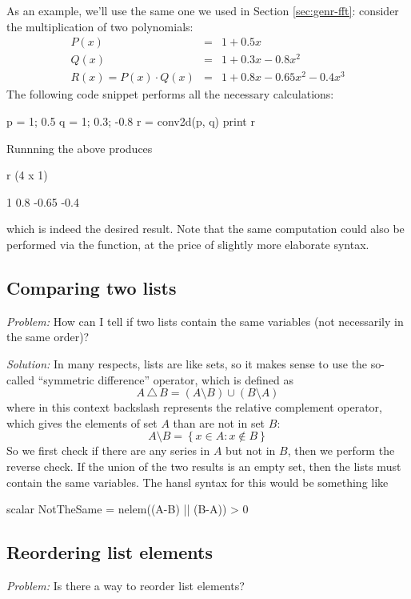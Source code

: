 As an example, we'll use the same one we used in Section
\ref{sec:genr-fft}: consider the multiplication of two polynomials:
\begin{eqnarray*}
  P(x) & = & 1 + 0.5 x \\
  Q(x) & = & 1 + 0.3 x - 0.8 x^2 \\
  R(x) = P(x) \cdot Q(x) & = & 1 + 0.8 x - 0.65 x^2 - 0.4 x^3
\end{eqnarray*}
The following code snippet performs all the necessary calculations:
\begin{code}
p = {1; 0.5}
q = {1; 0.3; -0.8}
r = conv2d(p, q)
print r
\end{code}
Runnning the above produces
\begin{code}
r (4 x 1)

      1
    0.8
  -0.65
   -0.4
\end{code}
which is indeed the desired result. Note that the same computation
could also be performed via the  function, at the price of
slightly more elaborate syntax.

\subsection{Comparing two lists}

\emph{Problem:} How can I tell if two lists contain the same variables
(not necessarily in the same order)?

\emph{Solution:} In many respects, lists are like sets, so it makes
sense to use the so-called ``symmetric difference'' operator, which is
defined as
\[
A\,\triangle\,B = (A \setminus B) \cup (B \setminus A)
\]
where in this context backslash represents the relative complement
operator, which gives the elements of set $A$ than are not in set $B$:
\[
A \setminus B = \left\{ x \in A : x \not \in B \right\}
\]
So we first check if there are any series in $A$ but not in $B$, then
we perform the reverse check. If the union of the two results is an
empty set, then the lists must contain the same variables. The hansl
syntax for this would be something like
\begin{code}
scalar NotTheSame = nelem((A-B) || (B-A)) > 0
\end{code}

\subsection{Reordering list elements}

\emph{Problem:} Is there a way to reorder list elements?

